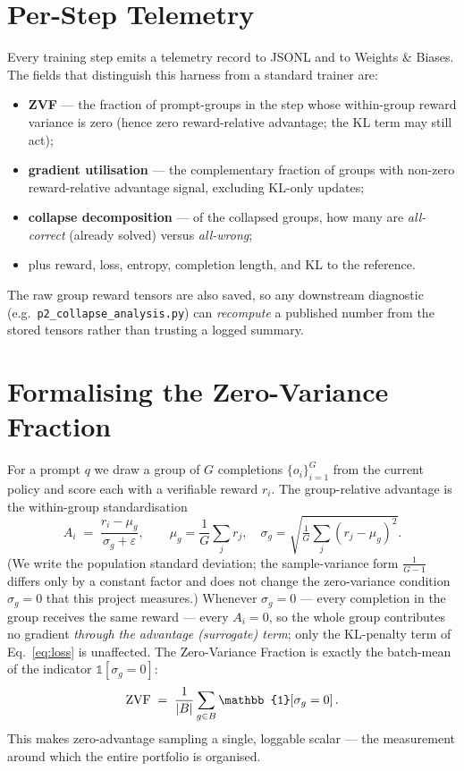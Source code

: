 \section{Per-Step Telemetry}
\label{sec:telemetry}
Every training step emits a telemetry record to JSONL and to Weights \& Biases. The
fields that distinguish this harness from a standard trainer are:
\begin{itemize}[leftmargin=1.4em,itemsep=1pt]
  \item \textbf{ZVF} --- the fraction of prompt-groups in the step whose within-group
  reward variance is zero (hence zero reward-relative advantage; the KL term may
  still act);
  \item \textbf{gradient utilisation} --- the complementary fraction of groups
  with non-zero reward-relative advantage signal, excluding KL-only updates;
  \item \textbf{collapse decomposition} --- of the collapsed groups, how many are
  \emph{all-correct} (already solved) versus \emph{all-wrong};
  \item plus reward, loss, entropy, completion length, and KL to the reference.
\end{itemize}
The raw group reward tensors are also saved, so any downstream diagnostic (e.g.\
\texttt{p2\_collapse\_analysis.py}) can \emph{recompute} a published number from the
stored tensors rather than trusting a logged summary.

\section{Formalising the Zero-Variance Fraction}
For a prompt $q$ we draw a group of $G$ completions $\{o_i\}_{i=1}^{G}$ from the
current policy and score each with a verifiable reward $r_i$. The group-relative
advantage is the within-group standardisation
\begin{equation}
A_i \;=\; \frac{r_i - \mu_g}{\sigma_g + \varepsilon},
\qquad
\mu_g = \frac{1}{G}\sum_{j} r_j,\quad
\sigma_g = \sqrt{\tfrac{1}{G}\sum_j (r_j-\mu_g)^2}.
\label{eq:adv}
\end{equation}
(We write the population standard deviation; the sample-variance form $\tfrac{1}{G-1}$
differs only by a constant factor and does not change the zero-variance condition
$\sigma_g=0$ that this project measures.) Whenever $\sigma_g = 0$ --- every completion in the group receives the same reward ---
every $A_i = 0$, so the whole group contributes no gradient \emph{through the
advantage (surrogate) term}; only the KL-penalty term of Eq.~\eqref{eq:loss} is
unaffected. The Zero-Variance
Fraction is exactly the batch-mean of the indicator $\mathbb{1}[\sigma_g = 0]$:
\begin{equation}
\zvf \;=\; \frac{1}{|B|}\sum_{g \in B} \mathbb{1}\!\left[\sigma_g = 0\right].
\label{eq:zvf}
\end{equation}
This makes zero-advantage sampling a single, loggable scalar --- the measurement around
which the entire portfolio is organised.


